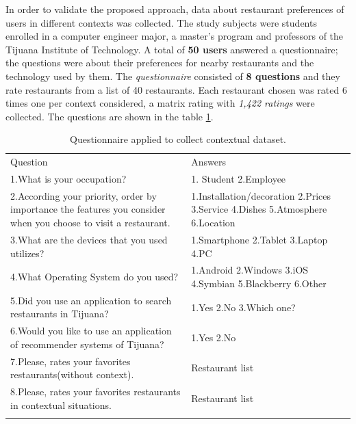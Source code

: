 In order to validate the proposed approach, data about restaurant
preferences of users in different contexts was collected. The study
subjects were students enrolled in a computer engineer major, a
master’s program and professors of the Tijuana Institute of
Technology. A total of \textbf{50 users} answered a questionnaire; the
questions were about their preferences for nearby restaurants and the
technology used by them. The \textit{questionnaire} consisted of \textbf{8
questions} and they rate restaurants from a list of 40 restaurants.
Each restaurant chosen was rated 6 times one per context considered, a
matrix rating with \textit{1,422 ratings} were collected. The
questions are shown in the table \ref{tab:questions}.
\begin{table}
\small
\captionsetup{font=footnotesize}
\caption{Questionnaire applied to collect contextual dataset.}
\label{tab:questions} 
\centering
\small
\begin{tabular}{p{7cm} p{5cm} }
\hline\noalign{\smallskip}
Question & Answers \\
\noalign{\smallskip}\hline\noalign{\smallskip}
\small{1.What is your occupation?} & \small{1. Student 2.Employee} \\ \hline  
\small{2.According your priority, order by importance the features 
you consider when you choose to visit a restaurant.} & 
\small{1.Installation/decoration 2.Prices 3.Service 4.Dishes
5.Atmosphere 6.Location} \\ \hline  
\small{3.What are the devices that you used
utilizes?} & \small{1.Smartphone 2.Tablet 3.Laptop 4.PC} \\ \hline   
\small{4.What Operating System do you used?} & 
\small{1.Android 2.Windows 3.iOS 4.Symbian 5.Blackberry 6.Other}
\\ \hline  
\small{5.Did you use an application to search restaurants in Tijuana?} &
\small{1.Yes 2.No 3.Which one?} \\ \hline   
\small{6.Would you like to use an application of
recommender systems of Tijuana?} & \small{1.Yes 2.No} \\ \hline  
\small{7.Please, rates your favorites restaurants(without context).} & 
\small{Restaurant list} \\ \hline
\small{8.Please, rates your favorites restaurants in contextual situations.} & 
\small{Restaurant list} \\
\noalign{\smallskip}\hline
\end{tabular}
\end{table}

